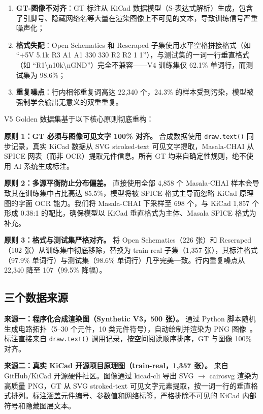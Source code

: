\begin{enumerate}[nosep]
    \item \textbf{GT-图像不对齐}：GT 标注从 KiCad 数据模型（S-表达式解析）生成，包含了引脚号、隐藏网络名等大量在渲染图像上不可见的文本，导致训练信号严重噪声化；
    \item \textbf{格式失配}：Open Schematics 和 Rescraped 子集使用水平空格拼接格式（如 ``+5V 5.1k R3 A1 A1 330 330 R2 R2 1 1''），与测试集的一词一行垂直格式（如 ``R1\textbackslash n10k\textbackslash nGND''）完全不兼容——V4 训练集仅 62.1\% 单词行，而测试集为 98.6\%；
    \item \textbf{重复噪点}：行内相邻重复词高达 22,340 个，24.3\% 的样本受到污染，模型被强制学会输出无意义的双重重复。
\end{enumerate}

V5 Golden 数据集基于以下核心原则彻底重构：

\textbf{原则 1：GT 必须与图像可见文字 100\% 对齐。} 合成数据使用 \texttt{draw.text()} 同步记录，真实 KiCad 数据从 SVG stroked-text 可见文字提取，Masala-CHAI 从 SPICE 网表（而非 OCR）提取元件信息。所有 GT 均来自确定性规则，绝不使用 AI 系统生成标注。

\textbf{原则 2：多源平衡防止分布偏差。} 直接使用全部 4,858 个 Masala-CHAI 样本会导致其在训练集中占比高达 85.5\%，模型将被 SPICE 格式主导而忽略 KiCad 原理图的字面 OCR 能力。我们将 Masala-CHAI 下采样至 698 个，与 KiCad 1,857 个形成 0.38:1 的配比，确保模型以 KiCad 垂直格式为主体、Masala SPICE 格式为补充。

\textbf{原则 3：格式与测试集严格对齐。} 将 Open Schematics（226 张）和 Rescraped（102 张）从训练集中彻底移除，替换为 train-real 子集（1,357 张），其标注格式（97.9\% 单词行）与测试集（98.6\% 单词行）几乎完美一致。行内重复噪点从 22,340 降至 107（99.5\% 降幅）。

\subsection{三个数据来源}

\textbf{来源一：程序化合成渲染图（Synthetic V3，500 张）。} 通过 Python 脚本随机生成电路拓扑（5--30 个元件，10 类元件符号），自动绘制并渲染为 PNG 图像~\citep{zhang2026circuitocr}。标注直接来自 \texttt{draw.text()} 调用记录，按空间阅读顺序排序，GT 与图像 100\% 对齐。

\textbf{来源二：真实 KiCad 开源项目原理图（train-real，1,357 张）。} 来自 GitHub/KiCad 开源硬件社区。图像通过 kicad-cli 导出 SVG $\to$ cairosvg 渲染为高质量 PNG，GT 从 SVG stroked-text 可见文字元素提取，按一词一行的垂直格式排列。标注涵盖元件编号、参数值和网络标签，严格排除不可见的 KiCad 内部符号和隐藏图层文本。

